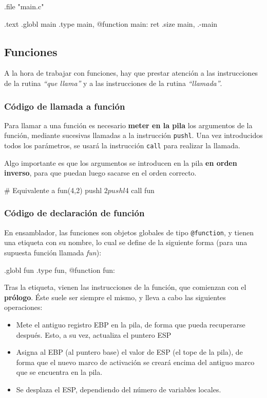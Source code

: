 \documentclass[11pt]{scrartcl}
\begin{document}
\begin{gascode}
    .file   "main.c"

    .text
    .globl  main
    .type   main, @function
main:
    ret
    .size   main, .-main
\end{gascode}

\subsection{Funciones}

A la hora de trabajar con funciones, hay que prestar atención a las
instrucciones de la rutina \textit{``que llama''} y a las instrucciones de la
rutina \textit{``llamada''}. 

\subsubsection{Código de llamada a función}

Para llamar a una función es necesario \textbf{meter en la pila} los argumentos
de la función, mediante sucesivas llamadas a la instrucción \texttt{pushl}. Una
vez introducidos todos los parámetros, se usará la instrucción \texttt{call}
para realizar la llamada.

Algo importante es que los argumentos se introducen en la pila \textbf{en orden
  inverso}, para que puedan luego sacarse en el orden correcto.

\begin{gascode}
# Equivalente a fun(4,2)  
    pushl   $2
    pushl   $4
    call    fun
\end{gascode}

\subsubsection{Código de declaración de función}

En ensamblador, las funciones son objetos globales de tipo \texttt{@function}, y
tienen una etiqueta con su nombre, lo cual se define de la siguiente forma (para
una supuesta función llamada \textit{fun}):

\begin{gascode}
    .globl  fun
    .type   fun, @function
fun:  
\end{gascode}

Tras la etiqueta, vienen las instrucciones de la función, que comienzan con el
\textbf{prólogo}. Éste suele ser siempre el mismo, y lleva a cabo las siguientes
operaciones:
\begin{itemize}
\item Mete el antiguo registro EBP en la pila, de forma que pueda recuperarse
  después. Esto, a su vez, actualiza el puntero ESP
\item Asigna al EBP (al puntero base) el valor de ESP (el tope de la pila), de
  forma que el nuevo marco de activación se creará encima del antiguo marco que
  se encuentra en la pila.
\item Se desplaza el ESP, dependiendo del número de variables locales.
\end{itemize}
\end{document}
